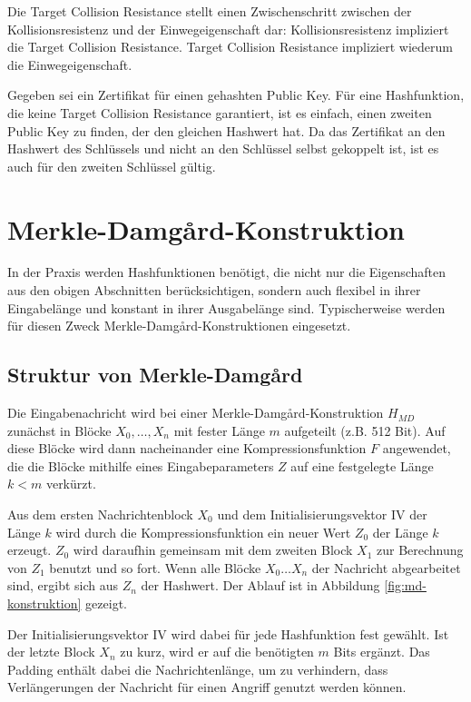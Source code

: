Die Target Collision Resistance stellt einen Zwischenschritt zwischen der Kollisionsresistenz und der Einwegeigenschaft dar: Kollisionsresistenz impliziert die
Target Collision Resistance. Target Collision Resistance impliziert wiederum die Einwegeigenschaft.\\


\begin{beispiel}
Gegeben sei ein Zertifikat für einen gehashten Public Key. Für eine Hashfunktion, die keine Target Collision Resistance garantiert, ist es einfach, einen
zweiten Public Key zu finden, der den gleichen Hashwert hat. Da das Zertifikat an den Hashwert des Schlüssels und nicht an den Schlüssel selbst gekoppelt ist,
ist es auch für den zweiten Schlüssel gültig.
\end{beispiel}



\section{Merkle-Damgård-Konstruktion}
\label{ch:hash:merkledamgard}
In der Praxis werden Hashfunktionen benötigt, die nicht nur die Eigenschaften aus den obigen Abschnitten berücksichtigen, sondern auch flexibel in ihrer
Eingabelänge und konstant in ihrer Ausgabelänge sind. Typischerweise werden für diesen Zweck Merkle-Damgård-Konstruktionen eingesetzt. 

\subsection{Struktur von Merkle-Damgård}

Die Eingabenachricht wird bei einer Merkle-Damgård-Konstruktion $H_{MD}$ zunächst in Blöcke $X_0, \ldots , X_n$ mit fester Länge $m$ aufgeteilt (z.B. 512 Bit).
Auf diese Blöcke wird dann nacheinander eine Kompressionsfunktion $F$ angewendet, die die Blöcke mithilfe eines Eingabeparameters $Z$ auf eine festgelegte Länge
$k < m$ verkürzt.

Aus dem ersten Nachrichtenblock $X_0$ und dem Initialisierungsvektor IV der Länge $k$ wird durch die Kompressionsfunktion ein neuer Wert $Z_0$ der Länge $k$
erzeugt. $Z_0$ wird daraufhin gemeinsam mit dem zweiten Block $X_1$ zur Berechnung von $Z_1$ benutzt und so fort. Wenn alle Blöcke $X_0 \ldots X_n$ der
Nachricht abgearbeitet sind, ergibt sich aus $Z_{n}$ der Hashwert. Der Ablauf ist in Abbildung \ref{fig:md-konstruktion} gezeigt.

Der Initialisierungsvektor IV wird dabei für jede Hashfunktion fest gewählt. Ist der letzte Block $X_n$ zu kurz, wird er auf die benötigten $m$ Bits ergänzt.
Das Padding enthält dabei die Nachrichtenlänge, um zu verhindern, dass Verlängerungen der Nachricht für einen Angriff genutzt werden können.

